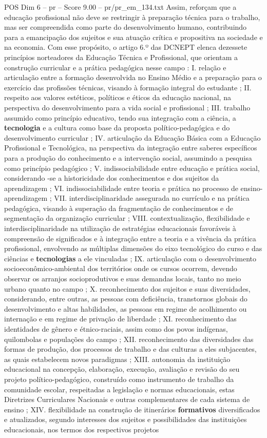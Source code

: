 \begin{textsample}{POS Dim 6 – pr – Score 9.00 – pr/pr\_em\_134.txt}
Assim, reforçam que a educação profissional não deve se restringir à preparação técnica para o trabalho, mas ser compreendida como parte do desenvolvimento humano, contribuindo para a emancipação dos sujeitos e sua atuação crítica e propositiva na sociedade e na economia.
Com esse propósito, o artigo 6.º das DCNEPT elenca dezessete princípios norteadores da Educação Técnica e Profissional, que orientam a construção curricular e a prática pedagógica nesse campo : I. relação e articulação entre a formação desenvolvida no Ensino Médio e a preparação para o exercício das profissões técnicas, visando à formação integral do estudante ; II. respeito aos valores estéticos, políticos e éticos da educação nacional, na perspectiva do desenvolvimento para a vida social e profissional ; III. trabalho assumido como princípio educativo, tendo sua integração com a ciência, a \textbf{tecnologia} e a cultura como base da proposta político-pedagógica e do desenvolvimento curricular ; IV. articulação da Educação Básica com a Educação Profissional e Tecnológica, na perspectiva da integração entre saberes específicos para a produção do conhecimento e a intervenção social, assumindo a pesquisa como princípio pedagógico ; V. indissociabilidade entre educação e prática social, considerando -se a historicidade dos conhecimentos e dos sujeitos da aprendizagem ; VI. indissociabilidade entre teoria e prática no processo de ensino-aprendizagem ; VII. interdisciplinaridade assegurada no currículo e na prática pedagógica, visando à superação da fragmentação de conhecimentos e de segmentação da organização curricular ; VIII. contextualização, flexibilidade e interdisciplinaridade na utilização de estratégias educacionais favoráveis à compreensão de significados e à integração entre a teoria e a vivência da prática profissional, envolvendo as múltiplas dimensões do eixo tecnológico do curso e das ciências e \textbf{tecnologias} a ele vinculadas ; IX. articulação com o desenvolvimento socioeconômico-ambiental dos territórios onde os cursos ocorrem, devendo observar os arranjos socioprodutivos e suas demandas locais, tanto no meio urbano quanto no campo ; X. reconhecimento dos sujeitos e suas diversidades, considerando, entre outras, as pessoas com deficiência, transtornos globais do desenvolvimento e altas habilidades, as pessoas em regime de acolhimento ou internação e em regime de privação de liberdade ; XI. reconhecimento das identidades de gênero e étnico-raciais, assim como dos povos indígenas, quilombolas e populações do campo ; XII. reconhecimento das diversidades das formas de produção, dos processos de trabalho e das culturas a eles subjacentes, as quais estabelecem novos paradigmas ; XIII. autonomia da instituição educacional na concepção, elaboração, execução, avaliação e revisão do seu projeto político-pedagógico, construído como instrumento de trabalho da comunidade escolar, respeitadas a legislação e normas educacionais, estas Diretrizes Curriculares Nacionais e outras complementares de cada sistema de ensino ; XIV. flexibilidade na construção de itinerários \textbf{formativos} diversificados e atualizados, segundo interesses dos sujeitos e possibilidades das instituições educacionais, nos termos dos respectivos projetos 
\end{textsample}
